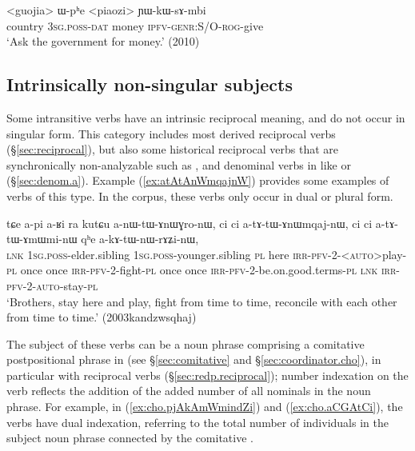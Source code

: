\begin{exe}
\ex   \label{ex:Wphe.piaozi}
 \gll <guojia> ɯ-pʰe <piaozi> ɲɯ-kɯ-sɤ-mbi \\
country \textsc{3sg}.\textsc{poss}-\textsc{dat} money \textsc{ipfv}-\textsc{genr}:S/O-\textsc{rog}-give \\
\glt `Ask the government for money.' (2010)
\end{exe}

\subsection{Intrinsically non-singular subjects} \label{sec:intrinsically.n.sg.subject}
Some intransitive verbs have an intrinsic reciprocal meaning, and do not occur in singular form. This category includes most derived reciprocal verbs (§\ref{sec:reciprocal}), but also some historical reciprocal verbs that are synchronically non-analyzable such as , and denominal verbs in  like  or  (§\ref{sec:denom.a}). Example (\ref{ex:atAtAnWmqajnW}) provides some examples of verbs of this type. In the corpus, these verbs only occur in dual or plural form.

\begin{exe}
\ex   \label{ex:atAtAnWmqajnW}
 \gll tɕe a-pi a-ʁi ra kutɕu a-nɯ-tɯ-ɤnɯɣro-nɯ, ci ci a-tɤ-tɯ-ɤnɯmqaj-nɯ, ci ci a-tɤ-tɯ-ɤmɯmi-nɯ qʰe a-kɤ-tɯ-nɯ-rɤʑi-nɯ, \\
\textsc{lnk} \textsc{1sg}.\textsc{poss}-elder.sibling  \textsc{1sg}.\textsc{poss}-younger.sibling \textsc{pl}  here \textsc{irr}-\textsc{pfv}-2-<\textsc{auto}>play-\textsc{pl} once once \textsc{irr}-\textsc{pfv}-2-fight-\textsc{pl} once once \textsc{irr}-\textsc{pfv}-2-be.on.good.terms-\textsc{pl} \textsc{lnk} \textsc{irr}-\textsc{pfv}-2-\textsc{auto}-stay-\textsc{pl}\\
\glt `Brothers, stay here and play, fight from time to time, reconcile with each other from time to time.' (2003kandzwsqhaj)
\end{exe}

The subject of these verbs can be a noun phrase comprising a comitative postpositional phrase in  (see §\ref{sec:comitative} and §\ref{sec:coordinator.cho}), in particular with reciprocal verbs (§\ref{sec:redp.reciprocal}); number indexation on the verb reflects the addition of the added number of all nominals in the noun phrase. For example, in (\ref{ex:cho.pjAkAmWmindZi}) and (\ref{ex:cho.aCGAtCi}), the verbs have dual indexation, referring to the total number of individuals in the subject noun phrase connected by the comitative .

